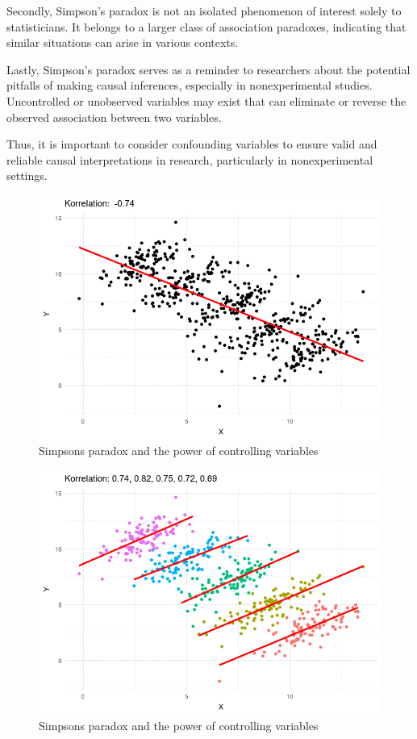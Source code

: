 \documentclass[
  12pt,
  oneside]{book}
\theoremstyle{definition}
\theoremstyle{definition}
\theoremstyle{definition}
\theoremstyle{definition}
\theoremstyle{remark}
\begin{document}
Secondly, Simpson's paradox is not an isolated phenomenon of interest solely to statisticians. It belongs to a larger class of association paradoxes, indicating that similar situations can arise in various contexts.

Lastly, Simpson's paradox serves as a reminder to researchers about the potential pitfalls of making causal inferences, especially in nonexperimental studies. Uncontrolled or unobserved variables may exist that can eliminate or reverse the observed association between two variables.

Thus, it is important to consider confounding variables to ensure valid and reliable causal interpretations in research, particularly in nonexperimental settings.

\begin{figure}

{\centering \includegraphics[width=9.72in]{fig/foo-13} 

}

\caption{Simpsons paradox and the power of controlling variables}\label{fig:foo-1}
\end{figure}
\begin{figure}

{\centering \includegraphics[width=9.72in]{fig/foo-32} 

}

\caption{Simpsons paradox and the power of controlling variables}\label{fig:foo-2}
\end{figure}
\end{document}
